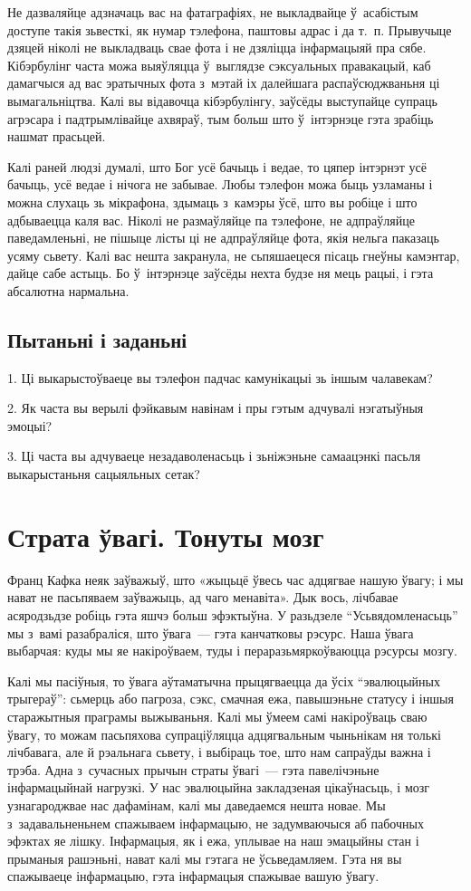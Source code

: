 Не дазваляйце адзначаць вас на фатаграфіях, не выкладвайце ў~асабістым доступе такія зьвесткі, як нумар тэлефона, паштовы адрас і да т.~п. Прывучыце дзяцей ніколі не выкладваць свае фота і не дзяліцца інфармацыяй пра сябе. Кібэрбулінг часта можа выяўляцца ў~выглядзе сэксуальных правакацый, каб дамагчыся ад вас эратычных фота з~мэтай іх далейшага распаўсюджваньня ці вымагальніцтва. Калі вы відавочца кібэрбулінгу, заўсёды выступайце супраць агрэсара і падтрымлівайце ахвяраў, тым больш што ў~інтэрнэце гэта зрабіць нашмат прасьцей.

Калі раней людзі думалі, што Бог усё бачыць і ведае, то цяпер інтэрнэт усё бачыць, усё ведае і нічога не забывае. Любы тэлефон можа быць узламаны і можна слухаць зь мікрафона, здымаць з~камэры ўсё, што вы робіце і што адбываецца каля вас. Ніколі не размаўляйце па тэлефоне, не адпраўляйце паведамленьні, не пішыце лісты ці не адпраўляйце фота, якія нельга паказаць усяму сьвету. Калі вас нешта закранула, не сьпяшаецеся пісаць гнеўны камэнтар, дайце сабе астыць. Бо ў~інтэрнэце заўсёды нехта будзе ня мець рацыі, і гэта абсалютна нармальна.

\subsection*{Пытаньні і заданьні}

1. Ці выкарыстоўваеце вы тэлефон падчас камунікацыі зь іншым чалавекам?

2. Як часта вы верылі фэйкавым навінам і пры гэтым адчувалі нэгатыўныя эмоцыі?

3. Ці часта вы адчуваеце незадаволенасьць і зьніжэньне самаацэнкі пасьля выкарыстаньня сацыяльных сетак?


\section{Страта ўвагі. Тонуты мозг}

Франц Кафка неяк заўважыў, што «жыцьцё ўвесь час адцягвае нашую ўвагу; і мы нават не пасьпяваем заўважыць, ад чаго менавіта». Дык вось, лічбавае асяродзьдзе робіць гэта яшчэ больш эфэктыўна. У разьдзеле ``Усьвядомленасьць'' мы з~вамі разабраліся, што ўвага~--- гэта канчатковы рэсурс. Наша ўвага выбарчая: куды мы яе накіроўваем, туды і пераразьмяркоўваюцца рэсурсы мозгу.

Калі мы пасіўныя, то ўвага аўтаматычна прыцягваецца да ўсіх ``эвалюцыйных трыгераў'': сьмерць або пагроза, сэкс, смачная ежа, павышэньне статусу і іншыя старажытныя праграмы выжываньня. Калі мы ўмеем самі накіроўваць сваю ўвагу, то можам пасьпяхова супраціўляцца адцягвальным чыньнікам ня толькі лічбавага, але й рэальнага сьвету, і выбіраць тое, што нам сапраўды важна і трэба. Адна з~сучасных прычын страты ўвагі~--- гэта павелічэньне інфармацыйнай нагрузкі. У нас эвалюцыйна закладзеная цікаўнасьць, і мозг узнагароджвае нас дафамінам, калі мы даведаемся нешта новае. Мы з~задавальненьнем спажываем інфармацыю, не задумваючыся аб пабочных эфэктах яе лішку. Інфармацыя, як і ежа, уплывае на наш эмацыйны стан і прыманыя рашэньні, нават калі мы гэтага не ўсьведамляем. Гэта ня вы спажываеце інфармацыю, гэта інфармацыя спажывае вашую ўвагу.

